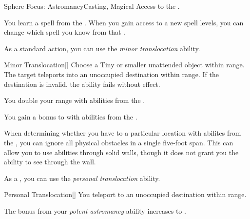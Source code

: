     \begin{feat}{Sphere Focus: Astromancy}{Casting, Magical}
        \featpre Access to the  .

         You learn a spell from the  .
        When you gain access to a new spell levels, you can change which spell you know from that .

         As a standard action, you can use the \textit{minor translocation} ability.
        \begin{ability}{Minor Translocation}[]
            Choose a Tiny or smaller unattended object within \rngclose range.
            The target teleports into an unoccupied destination within range.
            If the destination is invalid, the ability fails without effect.
        \end{ability}

         You double your range with abilities from the  .

         You gain a  bonus to  with abilities from the  . 

         When determining whether you have  to a particular location with abilites from the  , you can ignore all physical obstacles in a single five-foot span.
        This can allow you to use abilities through solid walls, though it does not grant you the ability to see through the wall.

         As a , you can use the \textit{personal translocation} ability.
        \begin{ability}{Personal Translocation}[]
            You teleport to an unoccupied destination within \rngclose range.
        \end{ability}

         The bonus from your \textit{potent astromancy} ability increases to .
    \end{feat}

